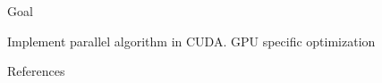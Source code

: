 \documentclass[
nopagebreaks,
style=klope,
fleqn]{powerdot}
\begin{document}
\begin{slide}{Goal}
  \begin{compactitem}
    \item{Implement parallel algorithm in CUDA. GPU specific optimization}
  \end{compactitem}
\end{slide}

\begin{slide} {References}
\footnotesize


\end{slide}
\end{document}

